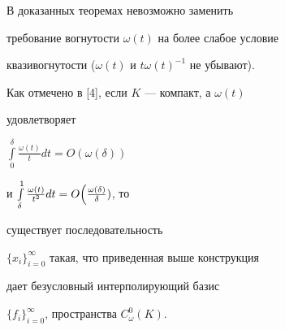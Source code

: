 \begin{note}


В доказанных теоремах невозможно заменить


требование вогнутости $\omega(t)$ на более слабое условие


квазивогнутости ($\omega(t)$ и $t\omega(t)^{-1}$ не убывают).


\end{note}





\begin{note}


Как отмечено в [4], если $K$ --- компакт, а $\omega(t)$


удовлетворяет


$\int\limits^\delta_0\frac{\omega(t)}{t}dt=O(\omega(\delta))$


и $\int\limits^1_\delta\frac{\omega(t)}{t^2}dt


= O\Bigl(\frac{\omega(\delta)}{\delta})$, то


существует последовательность


$\{x_i\}^\infty_{i=0}$ такая, что приведенная выше конструкция


дает безусловный интерполирующий базис


$\{f_i\}^\infty_{i=0}$, пространства $C^0_\omega(K)$.


\end{note}





